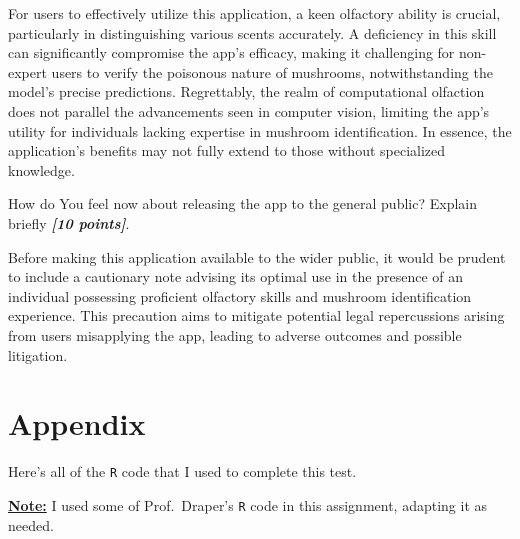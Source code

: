 \documentclass[12pt]{article}
\newcommand{\bi}[1]{\b{\i{#1}}}
\renewcommand{\b}[1]{\textbf{#1}}
\renewcommand{\i}[1]{\textit{#1}}
\renewcommand{\t}[1]{\texttt{#1}}
\renewcommand{\u}[1]{\underline{#1}}
\begin{document}
\begin{itemize}
{\color{blue}
For users to effectively utilize this application, a keen olfactory ability is crucial, particularly in distinguishing various scents accurately. A deficiency in this skill can significantly compromise the app's efficacy, making it challenging for non-expert users to verify the poisonous nature of mushrooms, notwithstanding the model's precise predictions. Regrettably, the realm of computational olfaction does not parallel the advancements seen in computer vision, limiting the app's utility for individuals lacking expertise in mushroom identification. In essence, the application's benefits may not fully extend to those without specialized knowledge.
}

How do You feel now about releasing the app to the general public? Explain briefly \bi{[10 points]}.

{\color{blue}
Before making this application available to the wider public, it would be prudent to include a cautionary note advising its optimal use in the presence of an individual possessing proficient olfactory skills and mushroom identification experience. This precaution aims to mitigate potential legal repercussions arising from users misapplying the app, leading to adverse outcomes and possible litigation.
}
\end{itemize}

\section*{Appendix}

Here's all of the \t{R} code that I used to complete this test. 

\u{\b{Note:}} I used some of Prof.~Draper’s \t{R} code in this assignment, adapting it as needed.
\end{document}
